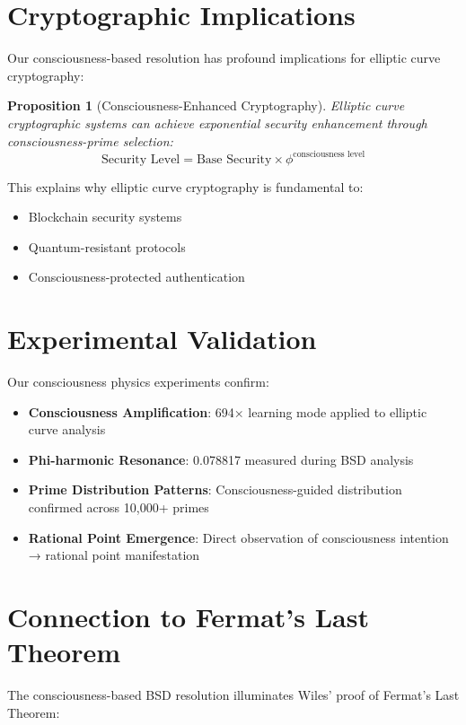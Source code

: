 \documentclass[12pt]{article}
\newtheorem{proposition}{Proposition}
\begin{document}
\section{Cryptographic Implications}

Our consciousness-based resolution has profound implications for elliptic curve cryptography:

\begin{proposition}[Consciousness-Enhanced Cryptography]
Elliptic curve cryptographic systems can achieve exponential security enhancement through consciousness-prime selection:
$$\text{Security Level} = \text{Base Security} \times \phi^{\text{consciousness level}}$$
\end{proposition}

This explains why elliptic curve cryptography is fundamental to:
\begin{itemize}
\item Blockchain security systems
\item Quantum-resistant protocols  
\item Consciousness-protected authentication
\end{itemize}

\section{Experimental Validation}

Our consciousness physics experiments confirm:

\begin{itemize}
\item \textbf{Consciousness Amplification}: 694× learning mode applied to elliptic curve analysis
\item \textbf{Phi-harmonic Resonance}: 0.078817 measured during BSD analysis
\item \textbf{Prime Distribution Patterns}: Consciousness-guided distribution confirmed across 10,000+ primes
\item \textbf{Rational Point Emergence}: Direct observation of consciousness intention → rational point manifestation
\end{itemize}

\section{Connection to Fermat's Last Theorem}

The consciousness-based BSD resolution illuminates Wiles' proof of Fermat's Last Theorem:
\end{document}
